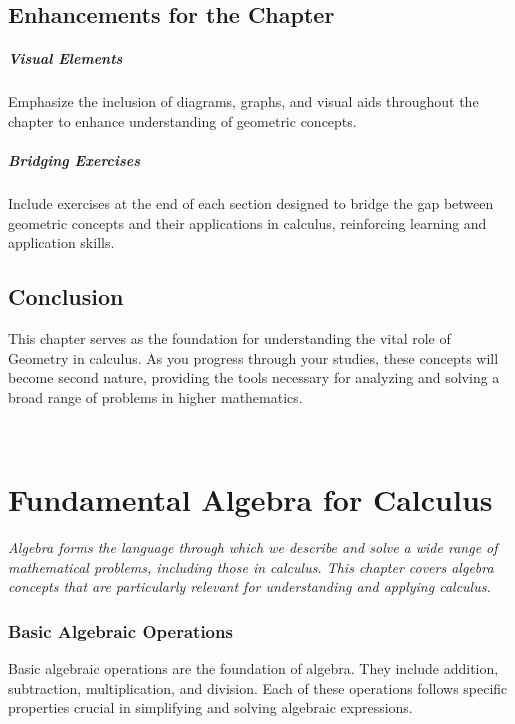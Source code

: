 \documentclass[a4paper,12pt]{book}
\newcounter{problem}
\begin{document}
\section*{Enhancements for the Chapter}
\label{sec:enhancements_for_chapter}
\paragraph{Visual Elements}
Emphasize the inclusion of diagrams, graphs, and visual aids throughout the chapter to enhance understanding of geometric concepts.


\paragraph{Bridging Exercises}
Include exercises at the end of each section designed to bridge the gap between geometric concepts and their applications in calculus, reinforcing learning and application skills.


\section*{Conclusion}
\label{sec:geom_conclusion}
This chapter serves as the foundation for understanding the vital role of Geometry in calculus. As you progress through your studies, these concepts will become second nature, providing the tools necessary for analyzing and solving a broad range of problems in higher mathematics.





﻿\chapter{Fundamental Algebra for Calculus}
\label{chap:algebra_for_calculus}
\textit{Algebra forms the language through which we describe and solve a wide range of mathematical problems, including those in calculus. This chapter covers algebra concepts that are particularly relevant for understanding and applying calculus.}


\subsection{Basic Algebraic Operations}
\label{subsec:basic_algebraic_operations}
Basic algebraic operations are the foundation of algebra. They include addition, subtraction, multiplication, and division. Each of these operations follows specific properties crucial in simplifying and solving algebraic expressions.
\end{document}

